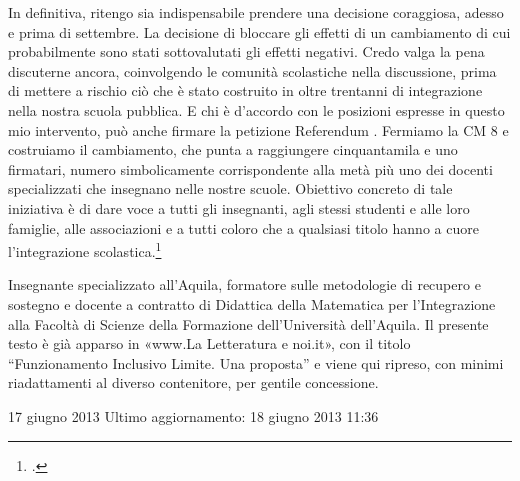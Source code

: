 In definitiva, ritengo sia indispensabile prendere una decisione coraggiosa, adesso e prima di settembre. La decisione di bloccare gli effetti di un cambiamento di cui probabilmente sono stati sottovalutati gli effetti negativi. Credo valga la pena discuterne ancora, coinvolgendo le comunità scolastiche nella discussione, prima di mettere a rischio ciò che è stato costruito in oltre trentanni di integrazione nella nostra scuola pubblica.
E chi è d'accordo con le posizioni espresse in questo mio intervento, può anche firmare la petizione Referendum . Fermiamo la CM 8 e costruiamo il cambiamento, che punta a raggiungere cinquantamila e uno firmatari, numero simbolicamente corrispondente alla metà più uno dei docenti specializzati che insegnano nelle nostre scuole.
Obiettivo concreto di tale iniziativa è di dare voce a tutti gli insegnanti, agli stessi studenti e alle loro famiglie, alle associazioni e a tutti coloro che a qualsiasi titolo hanno a cuore l'integrazione scolastica.\footcite{Scataglini2013}

Insegnante specializzato all'Aquila, formatore sulle metodologie di recupero e sostegno e docente a contratto di Didattica della Matematica per l'Integrazione alla Facoltà di Scienze della Formazione dell'Università dell'Aquila. Il presente testo è già apparso in «www.La Letteratura e noi.it», con il titolo “Funzionamento Inclusivo Limite. Una proposta” e viene qui ripreso, con minimi riadattamenti al diverso contenitore, per gentile concessione.

17 giugno 2013
Ultimo aggiornamento: 18 giugno 2013 11:36